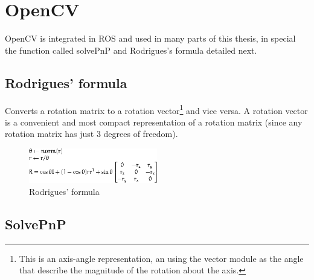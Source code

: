 \section{OpenCV}

OpenCV is integrated in ROS and used in many parts of this thesis, in special the function called solvePnP and Rodrigues's formula detailed next.


\subsection{Rodrigues' formula}

Converts a rotation matrix to a rotation vector\footnote{This is an axis-angle representation, an using the vector module as the angle that describe the magnitude of the rotation about the axis.} and vice versa. A rotation vector is a convenient and most compact representation of a rotation matrix (since any rotation matrix has just 3 degrees of freedom).

\begin{figure}[!htbp]
 \centering
 \includegraphics[width=0.5\textwidth]{images/rodrigues01.png}
 \caption{Rodrigues' formula}
 \label{fig:rodrigues}
\end{figure}




\subsection{SolvePnP}
\label{sec:solvePnP}

